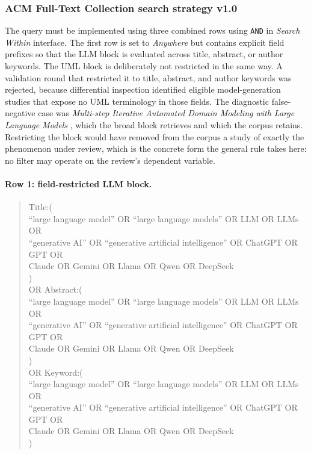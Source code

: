 \subsubsection{ACM Full-Text Collection search strategy v1.0}

The query must be implemented using three combined rows using \texttt{AND} in \emph{Search Within} interface. The first row is set to \emph{Anywhere} but contains explicit field prefixes so that the LLM block is evaluated across title, abstract, or author keywords. The UML block is deliberately not restricted in the same way. A validation round that restricted it to title, abstract, and author keywords was rejected, because differential inspection identified eligible model-generation studies that expose no UML terminology in those fields. The diagnostic false-negative case was \textit{Multi-step Iterative Automated Domain Modeling with Large Language Models} \cite{Yang2024MultiStepDomainModeling}, which the broad block retrieves and which the corpus retains. Restricting the block would have removed from the corpus a study of exactly the phenomenon under review, which is the concrete form the general rule takes here: no filter may operate on the review's dependent variable.

\paragraph{Row 1: field-restricted LLM block.}

\begin{quote}
\begin{minipage}{0.96\textwidth}
\scriptsize\ttfamily\raggedright
Title:(\\
\quad ``large language model'' OR ``large language models'' OR LLM OR LLMs OR\\
\quad ``generative AI'' OR ``generative artificial intelligence'' OR ChatGPT OR GPT OR\\
\quad Claude OR Gemini OR Llama OR Qwen OR DeepSeek\\
)\\
OR Abstract:(\\
\quad ``large language model'' OR ``large language models'' OR LLM OR LLMs OR\\
\quad ``generative AI'' OR ``generative artificial intelligence'' OR ChatGPT OR GPT OR\\
\quad Claude OR Gemini OR Llama OR Qwen OR DeepSeek\\
)\\
OR Keyword:(\\
\quad ``large language model'' OR ``large language models'' OR LLM OR LLMs OR\\
\quad ``generative AI'' OR ``generative artificial intelligence'' OR ChatGPT OR GPT OR\\
\quad Claude OR Gemini OR Llama OR Qwen OR DeepSeek\\
)
\end{minipage}
\end{quote}

